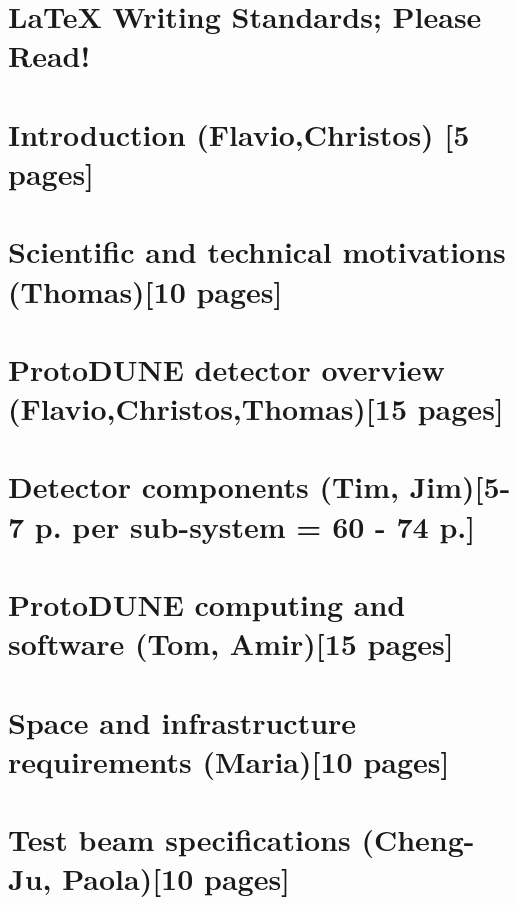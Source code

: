 \ifdefined\isfinal\documentclass[final]{pd-tdr}\else\documentclass{pd-tdr}\fi
\begin{document}







\chapter{LaTeX Writing Standards; Please Read!}


\chapter{Introduction {\color{red} (Flavio,Christos) [5 pages]}}


\chapter{Scientific and technical motivations {\color{red} (Thomas)[10 pages]}}


\chapter{ProtoDUNE detector overview {\color{red} (Flavio,Christos,Thomas)[15 pages]}}


\chapter{Detector components {\color{red} (Tim, Jim)[5-7 p. per sub-system = 60 - 74 p.]}}


\chapter{ProtoDUNE computing and software {\color{red} (Tom, Amir)[15 pages]}}


\chapter{Space and infrastructure requirements {\color{red} (Maria)[10 pages]}}


\chapter{Test beam specifications {\color{red} (Cheng-Ju, Paola)[10 pages]}} 

\end{document}
